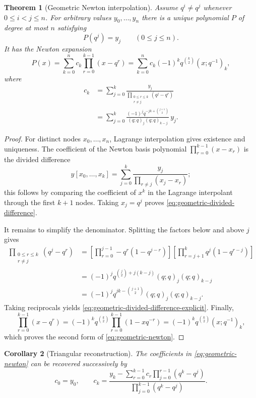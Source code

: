 \documentclass[11pt,oneside,openany]{book}
\newtheorem{theorem}{Theorem}[chapter]
\newtheorem{corollary}[theorem]{Corollary}
\theoremstyle{definition}
\theoremstyle{remark}
\begin{document}
\begin{theorem}[Geometric Newton interpolation]\label{thm:geometric-newton}
Assume $q^i\ne q^j$ whenever $0\le i<j\le n$.  For arbitrary values $y_0,\ldots,y_n$ there is a unique polynomial $P$ of degree at most $n$ satisfying
\[
 P(q^j)=y_j\qquad(0\le j\le n).
\]
It has the Newton expansion
\[
 P(x)=\sum_{k=0}^{n}c_k\prod_{r=0}^{k-1}(x-q^r)
 =\sum_{k=0}^{n}c_k(-1)^kq^{\binom k2}(x;q^{-1})_k,
 \tag{17.15}\label{eq:geometric-newton}
\]
where
\begin{align}
 c_k
 &=\sum_{j=0}^{k}
 \frac{y_j}{\prod_{\substack{0\le r\le k\\r\ne j}}(q^j-q^r)}
 \tag{17.16}\label{eq:geometric-divided-difference}\\
 &=\sum_{j=0}^{k}
 \frac{(-1)^j q^{-jk+\binom{j+1}{2}}}{(q;q)_j(q;q)_{k-j}}\,y_j.
 \tag{17.17}\label{eq:geometric-divided-difference-explicit}
\end{align}
\end{theorem}

\begin{proof}
For distinct nodes $x_0,\ldots,x_n$, Lagrange interpolation gives existence and uniqueness.  The coefficient of the Newton basis polynomial
\(
 \prod_{r=0}^{k-1}(x-x_r)
\)
is the divided difference
\[
 y[x_0,\ldots,x_k]
 =\sum_{j=0}^{k}\frac{y_j}{\prod_{r\ne j}(x_j-x_r)};
\]
this follows by comparing the coefficient of $x^k$ in the Lagrange interpolant through the first $k+1$ nodes.  Taking $x_j=q^j$ proves \eqref{eq:geometric-divided-difference}.

It remains to simplify the denominator.  Splitting the factors below and above $j$ gives
\begin{align*}
 \prod_{\substack{0\le r\le k\\r\ne j}}(q^j-q^r)
 &=\left[\prod_{r=0}^{j-1}-q^r(1-q^{j-r})\right]
   \left[\prod_{r=j+1}^{k}q^j(1-q^{r-j})\right]\\
 &=(-1)^jq^{\binom j2+j(k-j)}(q;q)_j(q;q)_{k-j}\\
 &=(-1)^jq^{jk-\binom{j+1}{2}}(q;q)_j(q;q)_{k-j}.
\end{align*}
Taking reciprocals yields \eqref{eq:geometric-divided-difference-explicit}.  Finally,
\[
 \prod_{r=0}^{k-1}(x-q^r)
 =(-1)^kq^{\binom k2}\prod_{r=0}^{k-1}(1-xq^{-r})
 =(-1)^kq^{\binom k2}(x;q^{-1})_k,
\]
which proves the second form of \eqref{eq:geometric-newton}.
\end{proof}

\begin{corollary}[Triangular reconstruction]\label{cor:geometric-triangular}
The coefficients in \eqref{eq:geometric-newton} can be recovered successively by
\[
 c_0=y_0,
 \qquad
 c_k=\frac{y_k-\sum_{r=0}^{k-1}c_r\prod_{j=0}^{r-1}(q^k-q^j)}
 {\prod_{j=0}^{k-1}(q^k-q^j)}.
 \tag{17.18}\label{eq:triangular-newton}
\]
\end{corollary}
\end{document}
